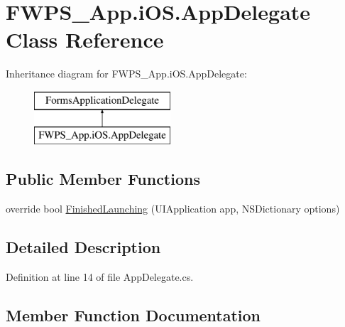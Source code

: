 \hypertarget{class_f_w_p_s___app_1_1i_o_s_1_1_app_delegate}{}\section{F\+W\+P\+S\+\_\+\+App.\+i\+O\+S.\+App\+Delegate Class Reference}
\label{class_f_w_p_s___app_1_1i_o_s_1_1_app_delegate}
Inheritance diagram for F\+W\+P\+S\+\_\+\+App.\+i\+O\+S.\+App\+Delegate\+:\begin{figure}[H]
\begin{center}
\leavevmode
\includegraphics[height=2.000000cm]{class_f_w_p_s___app_1_1i_o_s_1_1_app_delegate}
\end{center}
\end{figure}
\subsection*{Public Member Functions}
\begin{DoxyCompactItemize}
\item 
override bool \mbox{\hyperlink{class_f_w_p_s___app_1_1i_o_s_1_1_app_delegate_a5be48dbdffc2e91057c4fb20483b9dd9}{Finished\+Launching}} (U\+I\+Application app, N\+S\+Dictionary options)
\end{DoxyCompactItemize}


\subsection{Detailed Description}


Definition at line 14 of file App\+Delegate.\+cs.



\subsection{Member Function Documentation}
\mbox{\label{class_f_w_p_s___app_1_1i_o_s_1_1_app_delegate_a5be48dbdffc2e91057c4fb20483b9dd9}} 
